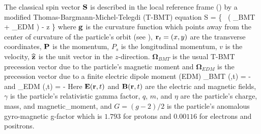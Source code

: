 The classical spin vector ${\bf S}$ is described in the local reference
frame () by a modified Thomas-Bargmann-Michel-Telegdi
(T-BMT) equation\cite{b:spin}
\Begineq
   \Bf S = 
  \left\{  \, 
  \left( {\pmb\Omega}_{BMT} + {\pmb\Omega}_{EDM} \right) - 
  \bfg \times \bfhat z \right\} \times {}
  \label{tbmt}
\Endeq
where ${\bf g}$ is the curvature function which points away from the
center of curvature of the particle's orbit (see
), ${\bf r}_t = (x, y)$ are the transverse
coordinates, ${\bf P}$ is the momentum, $P_s$ is the longitudinal momentum,
$v$ is the velocity, ${\widehat{\bf z}}$ is the unit vector in the
$z$-direction. $\pmb\Omega_{BMT}$ is the usual T-BMT precession vector
due to the particle's magnetic moment and $\pmb\Omega_{EDM}$ is the
precession vector due to a finite electric dipole moment (EDM) \cite{b:silenko}
\Begineq
  {\pmb\Omega}_{BMT} (,t) = 
    -  
\Endeq
and
\Begineq
  {\pmb\Omega}_{EDM} (,t) = 
  -  
\Endeq
Here ${\bf E} ({\bf r} ,t)$ and ${\bf B} ({\bf r} ,t)$ are the electric and
magnetic fields, $\gamma$ is the particle's relativistic gamma factor,
$q$, $m$, and $\eta$ are the particle's charge, mass, and
magnetic_moment, and $G = (g-2)/2$ is the particle's anomalous
gyro-magnetic g-factor which is $1.793$ for protons and $0.00116$ for
electrons and positrons.
   
